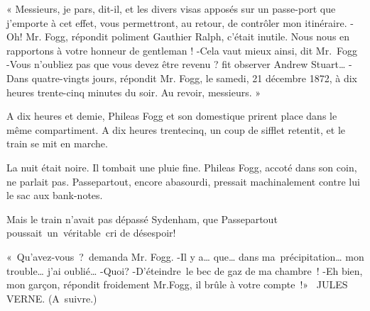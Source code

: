 \documentclass[]{book}
\begin{document}
               « Messieurs, je pars, dit-il, et les divers
               visas apposés sur un passe-port que j'emporte à cet effet, vous permettront, au retour, de contrôler mon itinéraire.\newline
               -Oh! Mr. Fogg, répondit poliment Gauthier Ralph, c'était inutile. Nous nous en
               rapportons à votre honneur de gentleman !\newline
               -Cela vaut mieux ainsi, dit Mr. Fogg \newline
               -Vous n'oubliez pas que vous devez
               être revenu ? fit observer Andrew 
               Stuart…\newline
               -Dans quatre-vingts jours, répondit 
               Mr. Fogg, le samedi, 21 décembre 1872, à 
               dix heures trente-cinq minutes du soir. Au
               revoir, messieurs. »\newline
            
               A dix heures et demie, Phileas Fogg et
               son domestique prirent place dans le 
               même compartiment. A dix heures trentecinq, un coup de sifflet retentit, et le train
               se mit en marche.
            
               La nuit était noire. Il tombait une pluie
               fine. Phileas Fogg, accoté dans son coin,
               ne parlait pas. Passepartout, encore abasourdi, pressait machinalement contre lui 
               le sac aux bank-notes.
            
               Mais le train n'avait pas dépassé Sydenham, que Passepartout poussait un véritable cri de désespoir!
            
               « Qu'avez-vous ? demanda Mr. Fogg.\newline
               -Il y a… que… dans ma précipitation…
               mon trouble… j'ai oublié…\newline
               -Quoi?\newline
               -D'éteindre le bec de gaz de ma chambre !\newline
               -Eh bien, mon garçon, répondit froidement Mr.Fogg, il brûle à votre compte !»\newline 
               JULES VERNE.
               (A suivre.)
            
            
            \printindex[persName]
            \printindex[placeName]
            
            \tableofcontents
            
            
\end{document}

